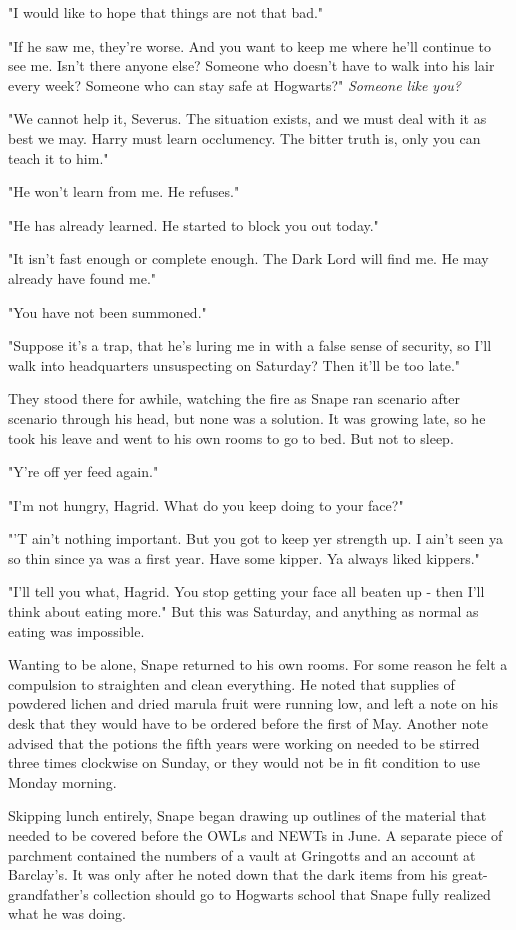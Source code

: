 \documentclass[a4paper,11pt]{article}
\begin{document}
"I would like to hope that things are not that bad."

"If he saw me, they're worse. And you want to keep me where he'll continue to see me. Isn't there anyone else? Someone who doesn't have to walk into his lair every week? Someone who can stay safe at Hogwarts?" \emph{Someone like you?}

"We cannot help it, Severus. The situation exists, and we must deal with it as best we may. Harry must learn occlumency. The bitter truth is, only you can teach it to him."

"He won't learn from me. He refuses."

"He has already learned. He started to block you out today."

"It isn't fast enough or complete enough. The Dark Lord will find me. He may already have found me."

"You have not been summoned."

"Suppose it's a trap, that he's luring me in with a false sense of security, so I'll walk into headquarters unsuspecting on Saturday? Then it'll be too late."

They stood there for awhile, watching the fire as Snape ran scenario after scenario through his head, but none was a solution. It was growing late, so he took his leave and went to his own rooms to go to bed. But not to sleep.

"Y're off yer feed again."

"I'm not hungry, Hagrid. What do you keep doing to your face?"

"'T ain't nothing important. But you got to keep yer strength up. I ain't seen ya so thin since ya was a first year. Have some kipper. Ya always liked kippers."

"I'll tell you what, Hagrid. You stop getting your face all beaten up - then I'll think about eating more." But this was Saturday, and anything as normal as eating was impossible.

Wanting to be alone, Snape returned to his own rooms. For some reason he felt a compulsion to straighten and clean everything. He noted that supplies of powdered lichen and dried marula fruit were running low, and left a note on his desk that they would have to be ordered before the first of May. Another note advised that the potions the fifth years were working on needed to be stirred three times clockwise on Sunday, or they would not be in fit condition to use Monday morning.

Skipping lunch entirely, Snape began drawing up outlines of the material that needed to be covered before the OWLs and NEWTs in June. A separate piece of parchment contained the numbers of a vault at Gringotts and an account at Barclay's. It was only after he noted down that the dark items from his great-grandfather's collection should go to Hogwarts school that Snape fully realized what he was doing.
\end{document}
